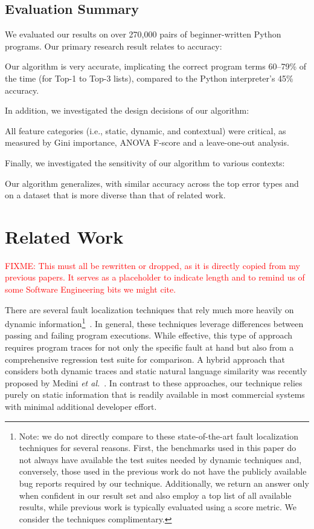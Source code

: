 \documentclass[conference]{IEEEtran}
\newcommand{\fixme}[1]{\textcolor{red}{FIXME: #1}}
\begin{document}
\subsection{Evaluation Summary}

We evaluated our results on over 270,000 pairs of beginner-written Python
programs. Our primary research result relates to accuracy: 
\begin{framed}
\noindent Our algorithm is very accurate, implicating the correct program
terms 60--79\% of the time (for Top-1 to Top-3 lists), compared to the
Python interpreter's 45\% accuracy. 
\end{framed} 
In addition, we investigated the design decisions of our algorithm:
\begin{framed}
\noindent All feature categories (i.e., static, dynamic, and contextual)
were critical, as measured by Gini importance, ANOVA F-score
and a leave-one-out analysis. 
\end{framed}
Finally, we investigated the sensitivity of our algorithm to various
contexts:
\begin{framed}
\noindent Our algorithm generalizes, with similar accuracy across the top
error types and on a dataset that is more diverse than that of related
work.
\end{framed} 



\section{Related Work}
\fixme{This must all be rewritten or dropped, as it is directly copied from
my previous papers. It serves as a placeholder to indicate length and to
remind us of some Software Engineering bits we might cite.}

There are several fault localization techniques that rely much more heavily
on dynamic information\footnote{Note: we do not directly compare to these
state-of-the-art fault localization techniques for several reasons.  First,
the benchmarks used in this paper do not always have available the test
suites needed by dynamic techniques and, conversely, those used in the
previous work do not have the publicly available bug reports required
by our technique.  Additionally, we return an answer only when confident in
our result set and also employ a top list of all available results, while
previous work is typically evaluated using a score metric.  We consider the
techniques complimentary.}~\cite
{harrold05,Renieris03,cleve05,wang09}.
In general,
these techniques leverage differences between passing and failing program
executions.  While effective, this type of approach requires program traces
for not only the specific fault at hand but also from a comprehensive regression
test suite for comparison.
A hybrid approach that considers both dynamic
traces and static natural language similarity was recently proposed by
Medini \textit{et al.}~\cite{Medini11}.
In contrast to these approaches, our technique relies purely on static
information that is readily available in most commercial systems with minimal
additional developer effort.
\end{document}
